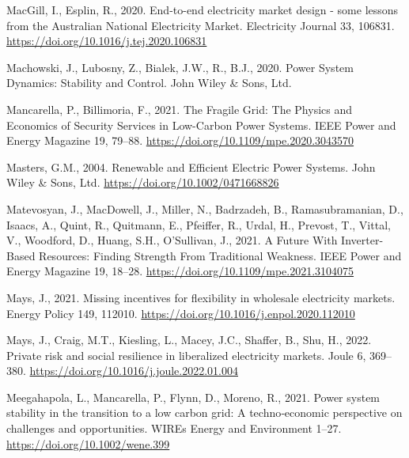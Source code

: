 \documentclass[12pt,a4paper,]{report}
\newlength{\cslhangindent}
\newenvironment{CSLReferences}[2] %
 {%
  \setlength{\parindent}{0pt}
  \ifodd #1 \everypar{\setlength{\hangindent}{\cslhangindent}}\ignorespaces\fi
  \ifnum #2 > 0
  \setlength{\parskip}{#2\baselineskip}
  \fi
 }%
 {}
\begin{document}
\begin{CSLReferences}{1}{0}
\leavevmode{}%
MacGill, I., Esplin, R., 2020. End-to-end electricity market design -
some lessons from the {Australian National Electricity Market}.
Electricity Journal 33, 106831.
\url{https://doi.org/10.1016/j.tej.2020.106831}

\leavevmode{}%
Machowski, J., Lubosny, Z., Bialek, J.W., R., B.J., 2020. Power {System
Dynamics}: {Stability} and {Control}. {John Wiley \& Sons, Ltd}.

\leavevmode{}%
Mancarella, P., Billimoria, F., 2021. The {Fragile Grid}: {The Physics}
and {Economics} of {Security Services} in {Low-Carbon Power Systems}.
IEEE Power and Energy Magazine 19, 79--88.
\url{https://doi.org/10.1109/mpe.2020.3043570}

\leavevmode{}%
Masters, G.M., 2004. Renewable and {Efficient Electric Power Systems}.
{John Wiley \& Sons, Ltd}. \url{https://doi.org/10.1002/0471668826}

\leavevmode{}%
Matevosyan, J., MacDowell, J., Miller, N., Badrzadeh, B.,
Ramasubramanian, D., Isaacs, A., Quint, R., Quitmann, E., Pfeiffer, R.,
Urdal, H., Prevost, T., Vittal, V., Woodford, D., Huang, S.H.,
O'Sullivan, J., 2021. A {Future With Inverter-Based Resources}: {Finding
Strength From Traditional Weakness}. IEEE Power and Energy Magazine 19,
18--28. \url{https://doi.org/10.1109/mpe.2021.3104075}

\leavevmode{}%
Mays, J., 2021. Missing incentives for flexibility in wholesale
electricity markets. Energy Policy 149, 112010.
\url{https://doi.org/10.1016/j.enpol.2020.112010}

\leavevmode{}%
Mays, J., Craig, M.T., Kiesling, L., Macey, J.C., Shaffer, B., Shu, H.,
2022. Private risk and social resilience in liberalized electricity
markets. Joule 6, 369--380.
\url{https://doi.org/10.1016/j.joule.2022.01.004}

\leavevmode{}%
Meegahapola, L., Mancarella, P., Flynn, D., Moreno, R., 2021. Power
system stability in the transition to a low carbon grid: {A}
techno‐economic perspective on challenges and opportunities. WIREs
Energy and Environment 1--27. \url{https://doi.org/10.1002/wene.399}


\end{CSLReferences}
\end{document}

